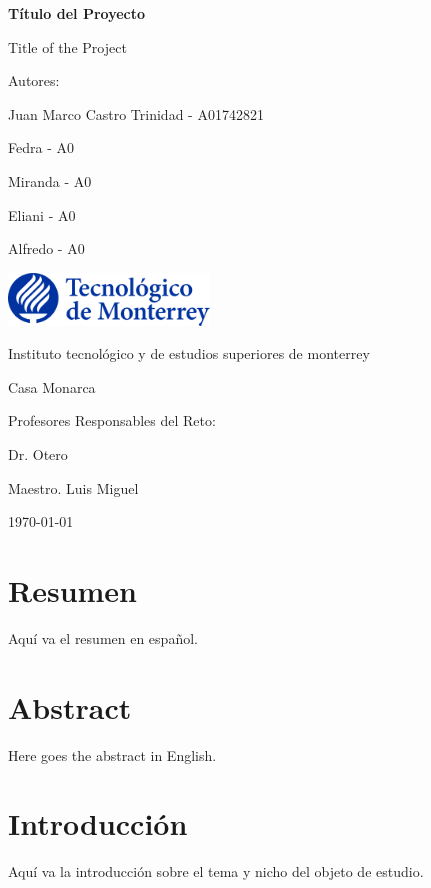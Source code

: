 \documentclass[a4paper,12pt]{report}
\begin{document}
\begin{titlepage}
    \centering
    {\Huge \bfseries Título del Proyecto \par}
    {\Large Title of the Project \par}
    \vspace{1cm}
    {\Large Autores: \par}
    \vspace{0.5cm}
    {\large Juan Marco Castro Trinidad - A01742821 \par}
    {\large Fedra - A0 \par}
    {\large Miranda - A0 \par}
    {\large Eliani - A0 \par}
    {\large Alfredo - A0 \par}
    \vfill
    \includegraphics[width=0.4\textwidth]{logo_tec.png} \par
    \vspace{0.5cm}
    {\Large Instituto tecnológico y de estudios superiores de monterrey  \par}
    {\Large Casa Monarca \par}
    \vfill
    {\Large Profesores Responsables del Reto: \par}
    {\large Dr. Otero \par}
    {\large Maestro. Luis Miguel \par}
    \vfill
    {\large \today \par}
\end{titlepage}

\tableofcontents
\newpage

\chapter*{Resumen}
Aquí va el resumen en español.

\chapter*{Abstract}
Here goes the abstract in English.

\chapter{Introducción}
Aquí va la introducción sobre el tema y nicho del objeto de estudio.
\end{document}
